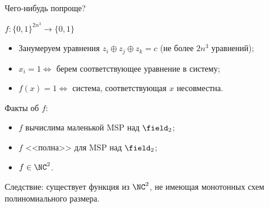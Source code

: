 \begin{frame}{Чего-нибудь попроще?}

    $f\colon \{0, 1\}^{2 n^3} \to \{0, 1\}$

    \begin{itemize}
        \item Занумеруем уравнения $z_i \oplus z_j \oplus z_k = c$ (не более $2 n^3$ уравнений);
        \item $x_i = 1 \Leftrightarrow$ берем соответствующее уравнение в систему;
        \item $f(x) = 1 \Leftrightarrow$ система, соответствующая $x$ несовместна.
    \end{itemize}

    \pause
    Факты об $f$:
    \begin{itemize}
        \item $f$ вычислима маленькой MSP над $\field_2$;
            \pause
        \item $f$ <<полна>> для MSP над $\field_2$;
            \pause
        \item $f \in \NC^2$. 
    \end{itemize}

    Следствие: существует функция из $\NC^2$, не имеющая монотонных схем полиномиального размера.
\end{frame}
